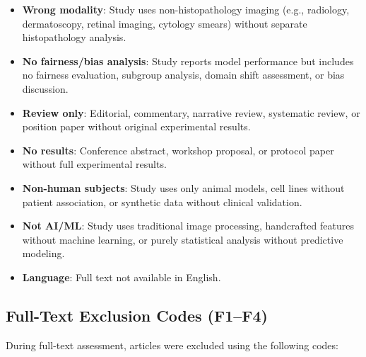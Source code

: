 \begin{itemize}
  \item[\textbf{E1}] \textbf{Wrong modality}: Study uses non-histopathology imaging (e.g., radiology, dermatoscopy, retinal imaging, cytology smears) without separate histopathology analysis.
  
  \item[\textbf{E2}] \textbf{No fairness/bias analysis}: Study reports model performance but includes no fairness evaluation, subgroup analysis, domain shift assessment, or bias discussion.
  
  \item[\textbf{E3}] \textbf{Review only}: Editorial, commentary, narrative review, systematic review, or position paper without original experimental results.
  
  \item[\textbf{E4}] \textbf{No results}: Conference abstract, workshop proposal, or protocol paper without full experimental results.
  
  \item[\textbf{E5}] \textbf{Non-human subjects}: Study uses only animal models, cell lines without patient association, or synthetic data without clinical validation.
  
  \item[\textbf{E6}] \textbf{Not AI/ML}: Study uses traditional image processing, handcrafted features without machine learning, or purely statistical analysis without predictive modeling.
  
  \item[\textbf{E7}] \textbf{Language}: Full text not available in English.
\end{itemize}

\subsection*{Full-Text Exclusion Codes (F1--F4)}

During full-text assessment, articles were excluded using the following codes:

